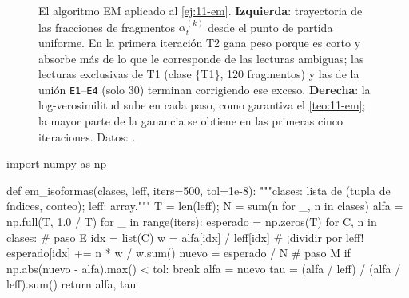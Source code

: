 \begin{figure}[t]
\centering
{}
\caption[Convergencia del algoritmo EM]{El algoritmo EM aplicado al \cref{ej:11-em}. \textbf{Izquierda}: trayectoria de las fracciones de fragmentos $\alpha_t^{(k)}$ desde el punto de partida uniforme. En la primera iteración T2 gana peso porque es corto y absorbe más de lo que le corresponde de las lecturas ambiguas; las lecturas exclusivas de T1 (clase \{T1\}, 120 fragmentos) y las de la unión \texttt{E1}--\texttt{E4} (solo 30) terminan corrigiendo ese exceso. \textbf{Derecha}: la log-verosimilitud sube en cada paso, como garantiza el \cref{teo:11-em}; la mayor parte de la ganancia se obtiene en las primeras cinco iteraciones. Datos: .}
\label{fig:11-em}
\end{figure}

\begin{codigo}[em\_isoformas.py]
import numpy as np

def em_isoformas(clases, leff, iters=500, tol=1e-8):
    """clases: lista de (tupla de índices, conteo); leff: array."""
    T = len(leff); N = sum(n for _, n in clases)
    alfa = np.full(T, 1.0 / T)
    for _ in range(iters):
        esperado = np.zeros(T)
        for C, n in clases:                 # paso E
            idx = list(C)
            w = alfa[idx] / leff[idx]       # ¡dividir por leff!
            esperado[idx] += n * w / w.sum()
        nuevo = esperado / N                # paso M
        if np.abs(nuevo - alfa).max() < tol:
            break
        alfa = nuevo
    tau = (alfa / leff) / (alfa / leff).sum()
    return alfa, tau
\end{codigo}

